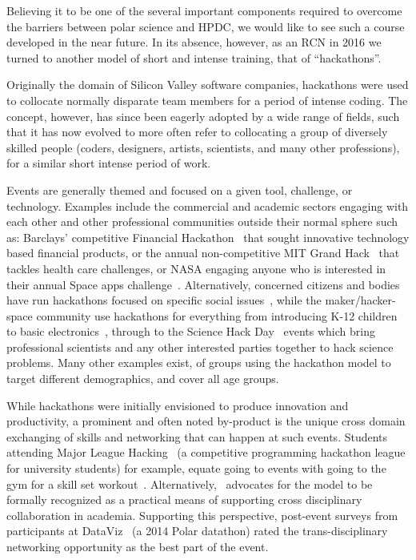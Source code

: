 \documentclass[conference]{IEEEtran}
\begin{document}
Believing it to be one of the several important components required to overcome the barriers between polar science and HPDC, we would like to see such a course developed in the near future. In its absence, however, as an RCN in 2016 we turned to another model of short and intense training, that of ``hackathons''. 

Originally the domain of Silicon Valley software companies, hackathons were used to collocate normally disparate team members for a period of intense coding. The concept, however, has since been eagerly adopted by a wide range of fields, such that it has now evolved to more often refer to collocating a group of diversely skilled people (coders, designers, artists, scientists, and many other professions), for a similar short intense period of work.  

Events are generally themed and focused on a given tool, challenge, or technology. Examples include the commercial and academic sectors engaging with each other and other professional communities outside their normal sphere such as: Barclays' competitive Financial Hackathon~\cite{noauthor_undated-rc} that sought innovative technology based financial products, or the annual non-competitive MIT Grand Hack~\cite{noauthor_undated-zx} that tackles health care challenges, or NASA engaging anyone who is interested in their annual Space apps challenge~\cite{noauthor_undated-rb}.  Alternatively, concerned citizens and bodies have run hackathons focused on specific social issues~\cite{noauthor_undated-qo,noauthor_undated-vs}, while the maker/hacker-space community use hackathons for everything from introducing K-12 children to basic electronics~\cite{Aboab2016-tk}, through to the Science Hack Day~\cite{noauthor_undated-qs} events which bring professional scientists and any other interested parties together to hack science problems.  Many other examples exist, of groups using the hackathon model to target different demographics, and cover all age groups.  

While hackathons were initially envisioned to produce innovation and productivity, a prominent and often noted by-product is the unique cross domain exchanging of skills and networking that can happen at such events. Students attending Major League Hacking~\cite{noauthor_undated-tz} (a competitive programming hackathon league for university students) for example, equate going to events with going to the gym for a skill set workout~\cite{Leckart2015-go}.  Alternatively,~\cite{Aboab2016-tk} advocates for the model to be formally recognized as a practical means of supporting cross disciplinary collaboration in academia. Supporting this perspective, post-event surveys from participants at DataViz~\cite{mattmann2015} (a 2014 Polar datathon) rated the trans-disciplinary networking opportunity as the best part of the event.
\end{document}

